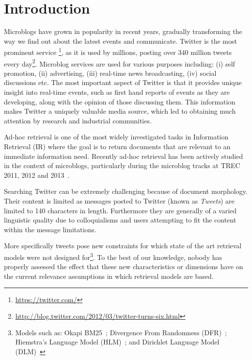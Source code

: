 \section{Introduction}
\label{introduction}

Microblogs have grown in popularity in recent years, gradually transforming the way we find out about the latest events and communicate. Twitter is the most prominent service \footnote{\url{https://twitter.com/}}, as it is used by millions, posting over 340 million tweets every day\footnote{\url{http://blog.twitter.com/2012/03/twitter-turns-six.html}}. Microblog services are used for various purposes including: (i) self promotion, (ii) advertising, (iii) real-time news broadcasting, (iv) social discussions etc. The most important aspect of Twitter is that it provides unique insight into real-time events, such as first hand reports of events as they are developing, along with the opinion of those discussing them.
This information makes Twitter a uniquely valuable media source, which led to obtaining much attention by research and industrial communities.

Ad-hoc retrieval is one of the most widely investigated tasks in Information Retrieval (IR) where the goal is to return documents that are relevant to an immediate information need. Recently ad-hoc retrieval has been actively studied in the context of microblogs, particularly during the microblog tracks at TREC 2011, 2012 and 2013~\cite{ounis2011overview}. 

Searching Twitter can be extremely challenging because of document morphology. Their content is limited as messages posted to Twitter (known as \emph{Tweets}) are limited to 140 characters in length. Furthermore they are generally of a varied linguistic quality \cite{teevan2011twittersearch} due to colloquialisms and users attempting to fit the content within the message limitations. 

More specifically tweets pose new constraints for which state of the art retrieval models were not designed for\footnote{Models such as: Okapi BM25~\cite{robertson2009probabilistic}; Divergence From Randomness (DFR)~\cite{amati2003probabilistic}; Hiemstra's Language Model (HLM)~\cite{model}; and Dirichlet Language Model (DLM)~\cite{zhai2001study}}. To the best of our knowledge, nobody has properly assessed the effect that these new characteristics or dimensions have on the current relevance assumptions in which retrieval models are based.

